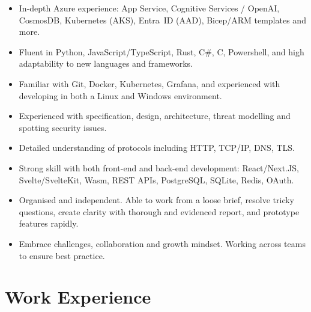   \begin{itemize}
    \item In-depth Azure experience: App Service, Cognitive Services / OpenAI, CosmosDB, Kubernetes (AKS), Entra~ID (AAD), Bicep/ARM templates and more.
    \item Fluent in Python, JavaScript/TypeScript, Rust, C\#, C, Powershell, and high adaptability to new languages and frameworks.
    \item Familiar with Git, Docker, Kubernetes, Grafana, and experienced with developing in both a Linux and Windows environment.
    \item Experienced with specification, design, architecture, threat modelling and spotting security issues.
    \item Detailed understanding of protocols including HTTP, TCP/IP, DNS, TLS.
    \item Strong skill with both front-end and back-end development: React/Next.JS, Svelte/SvelteKit, Wasm, REST APIs, PostgreSQL, SQLite, Redis, OAuth.
    \item Organised and independent. Able to work from a loose brief, resolve tricky questions, create clarity with thorough and evidenced report, and prototype features rapidly.
    \item Embrace challenges, collaboration and growth mindset. Working across teams to ensure best practice.
  \end{itemize}

  \section{Work Experience}

